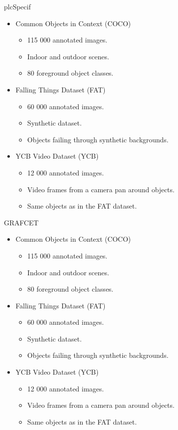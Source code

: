 \documentclass[18pt]{beamer}
\begin{document}
\begin{frame}{plcSpecif}
\begin{itemize}
	\item Common Objects in Context (COCO)
	\begin{itemize}
		\item 115 000 annotated images.
		\item Indoor and outdoor scenes.
		\item 80 foreground object classes.
	\end{itemize}
	\item Falling Things Dataset (FAT)
	\begin{itemize}
		\item 60 000 annotated images.
		\item Synthetic dataset.
		\item Objects failing through synthetic backgrounds.
	\end{itemize}
	\item YCB Video Dataset (YCB)
	\begin{itemize}
		\item 12 000 annotated images.
		\item Video frames from a camera pan around objects.
		\item Same objects as in the FAT dataset.
	\end{itemize}
\end{itemize}
\end{frame}

\begin{frame}{GRAFCET}
\begin{itemize}
	\item Common Objects in Context (COCO)
	\begin{itemize}
		\item 115 000 annotated images.
		\item Indoor and outdoor scenes.
		\item 80 foreground object classes.
	\end{itemize}
	\item Falling Things Dataset (FAT)
	\begin{itemize}
		\item 60 000 annotated images.
		\item Synthetic dataset.
		\item Objects failing through synthetic backgrounds.
	\end{itemize}
	\item YCB Video Dataset (YCB)
	\begin{itemize}
		\item 12 000 annotated images.
		\item Video frames from a camera pan around objects.
		\item Same objects as in the FAT dataset.
	\end{itemize}
\end{itemize}
\end{frame}
\end{document}
